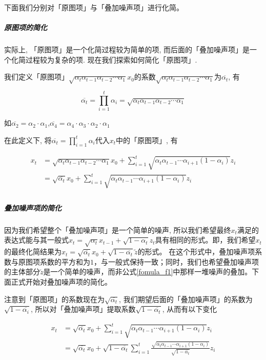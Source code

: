 下面我们分别对「原图项」与「叠加噪声项」进行化简。


\subparagraph{原图项的简化}

实际上, 「原图项」是一个化简过程较为简单的项, 而后面的「叠加噪声项」是一个化简过程较为复杂的项. 现在我们探索如何简化「原图项」.

我们定义「原图项」$\sqrt{\alpha_t\alpha_{t-1}\alpha_{t-2}\cdots\alpha_1}x_0$的系数$\sqrt{\alpha_t\alpha_{t-1}\alpha_{t-2}\cdots\alpha_1}$为$\overline{\alpha_t}$,  有

\begin{equation}
    \overline{\alpha_t} = \prod\limits_{i=1}^t\alpha_i=\sqrt{\alpha_t\alpha_{t-1}\alpha_{t-2}\cdots\alpha_1} \tag{5}
\end{equation}

如$\overline{\alpha_2}=\alpha_2\cdot\alpha_1$,$\overline{\alpha_4}=\alpha_4\cdot\alpha_3\cdot\alpha_2\cdot\alpha_1$

在此定义下, 将$\overline{\alpha_t} = \prod\limits_{i=1}^t\alpha_i$代入$x_t$中的「原图项」, 有

\begin{equation}
    \begin{aligned}
        x_t &= \sqrt{\alpha_t\alpha_{t-1}\alpha_{t-2}\cdots\alpha_1}x_0+ \sum_{i=1}^t\sqrt{\alpha_t\alpha_{t-1}\cdots\alpha_{i+1}(1-\alpha_i)}z_i\\
        &= \sqrt{\overline{\alpha_t}}x_0 + \sum_{i=1}^t\sqrt{\alpha_t\alpha_{t-1}\cdots\alpha_{i+1}(1-\alpha_i)}z_i\\
    \end{aligned}
\end{equation}

\subparagraph{叠加噪声项的简化}

因为我们希望整个「叠加噪声项」是一个简单的噪声, 所以我们希望最终$x_t$满足的表达式能与其一般式$x_t = \sqrt{\alpha_t}x_{t-1}+\sqrt{1-\alpha_t}z_t$具有相同的形式。即，我们希望$x_t$的最终化简结果为$x_t=\sqrt{\overline{\alpha_t}}x_0+\sqrt{1-\overline{\alpha_t}}\widetilde{z}$的形式。 在这个形式中，叠加噪声项系数与原图项系数的平方和为$1$，与一般式保持一致；同时，我们也希望叠加噪声项的主体部分$\widetilde{z}$是一个简单的噪声，而非公式\ref{fomula_f1}中那样一堆噪声的叠加。下面正式开始对叠加噪声项的简化。

  注意到「原图项」的系数现在为$\sqrt{\overline{\alpha_t}}$, 我们期望后面的「叠加噪声项」的系数为$\sqrt{1-\overline{\alpha_i}}$, 所以对「叠加噪声项」提取系数$\sqrt{1-\overline{\alpha_t}}$, 从而有以下变化


\begin{equation}
\begin{aligned}
    \label{fomula_f2}
x_t &= \sqrt{\overline{\alpha_t}}x_0 + \sum_{i=1}^t\sqrt{\alpha_t\alpha_{t-1}\cdots\alpha_{i+1}(1-\alpha_i)}z_i\\
&= \sqrt{\overline{\alpha_t}}x_0 +\sqrt{1-\overline{\alpha_t}}\sum_{i=1}^t\frac{\sqrt{\alpha_t\alpha_{t-1}\cdots\alpha_{i+1}(1-\alpha_i)}}{\sqrt{1-\overline{\alpha_t}}}z_i
\end{aligned}
\end{equation}




